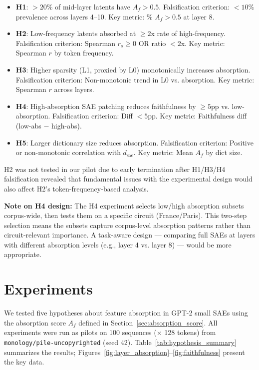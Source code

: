 \documentclass{article}
\begin{document}
\begin{itemize}
\item \textbf{H1}: $>20\%$ of mid-layer latents have $A_f > 0.5$. Falsification criterion: $<10\%$ prevalence across layers 4--10. Key metric: \% $A_f > 0.5$ at layer 8.
\item \textbf{H2}: Low-frequency latents absorbed at $\geq 2$x rate of high-frequency. Falsification criterion: Spearman $r_s \geq 0$ OR ratio $<2$x. Key metric: Spearman $r$ by token frequency.
\item \textbf{H3}: Higher sparsity (L1, proxied by L0) monotonically increases absorption. Falsification criterion: Non-monotonic trend in L0 vs. absorption. Key metric: Spearman $r$ across layers.
\item \textbf{H4}: High-absorption SAE patching reduces faithfulness by $\geq 5$pp vs. low-absorption. Falsification criterion: Diff $<5$pp. Key metric: Faithfulness diff (low-abs $-$ high-abs).
\item \textbf{H5}: Larger dictionary size reduces absorption. Falsification criterion: Positive or non-monotonic correlation with $d_{\text{sae}}$. Key metric: Mean $A_f$ by dict size.
\end{itemize}

H2 was not tested in our pilot due to early termination after H1/H3/H4 falsification revealed that fundamental issues with the experimental design would also affect H2's token-frequency-based analysis.

\textbf{Note on H4 design:} The H4 experiment selects low/high absorption subsets corpus-wide, then tests them on a specific circuit (France/Paris). This two-step selection means the subsets capture corpus-level absorption patterns rather than circuit-relevant importance. A task-aware design --- comparing full SAEs at layers with different absorption levels (e.g., layer 4 vs. layer 8) --- would be more appropriate.


\section{Experiments}

We tested five hypotheses about feature absorption in GPT-2 small SAEs using the absorption score $A_f$ defined in Section~\ref{sec:absorption_score}. All experiments were run as pilots on 100 sequences ($\times$ 128 tokens) from \texttt{monology/pile-uncopyrighted} (seed 42). Table~\ref{tab:hypothesis_summary} summarizes the results; Figures~\ref{fig:layer_absorption}--\ref{fig:faithfulness} present the key data.
\end{document}
